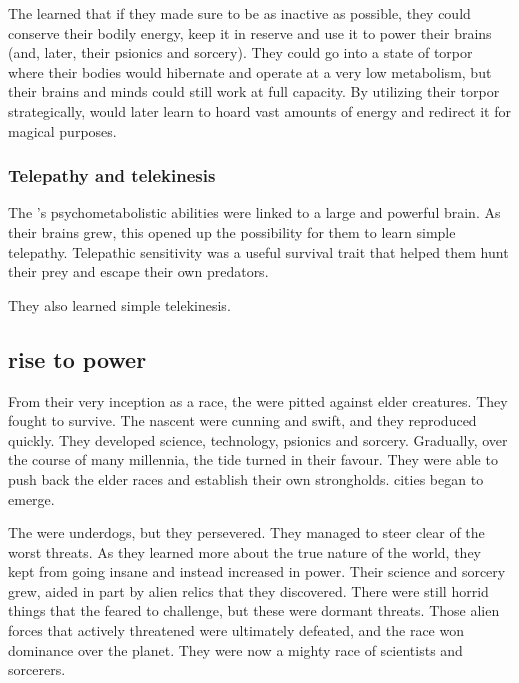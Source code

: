 The \ophidians{} learned that if they made sure to be as inactive as possible, they could conserve their bodily energy, keep it in reserve and use it to power their brains (and, later, their psionics and sorcery). 
They could go into a state of torpor where their bodies would hibernate and operate at a very low metabolism, but their brains and minds could still work at full capacity. 
By utilizing their torpor strategically,  would later learn to hoard vast amounts of energy and redirect it for magical purposes. 





\subsubsection{Telepathy and telekinesis}
The \caisith's psychometabolistic abilities were linked to a large and powerful brain. 
As their brains grew, this opened up the possibility for them to learn simple telepathy. 
Telepathic sensitivity was a useful survival trait that helped them hunt their prey and escape their own predators. 

They also learned simple telekinesis. 









\subsection{\Ophidian rise to power}
From their very inception as a race, the \ophidians were pitted against elder creatures. 
They fought to survive. 
The nascent \ophidians were cunning and swift, and they reproduced quickly. 
They developed science, technology, psionics and sorcery.
Gradually, over the course of many millennia, the tide turned in their favour. 
They were able to push back the elder races and establish their own strongholds.
\Ophidian cities began to emerge. 

The \ophidians were underdogs, but they persevered. 
They managed to steer clear of the worst threats. 
As they learned more about the true nature of the world, they kept from going insane and instead increased in power. 
Their science and sorcery grew, aided in part by alien relics that they discovered. 
There were still horrid things that the \ophidians feared to challenge, but these were dormant threats. 
Those alien forces that actively threatened were ultimately defeated, and the \ophidian race won dominance over the planet. 
They were now a mighty race of scientists and sorcerers.

